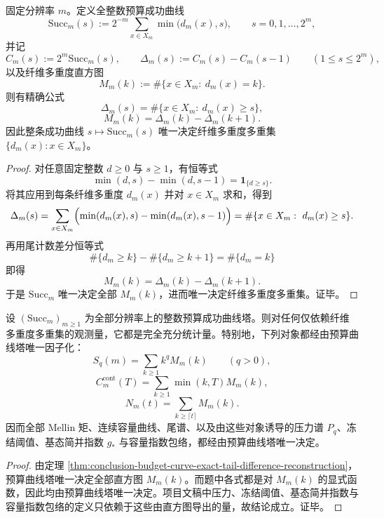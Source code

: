 \begin{theorem}[全整数预算成功曲线的完全充分性]\label{thm:conclusion-budget-curve-exact-tail-difference-reconstruction}
固定分辨率 \(m\)。定义全整数预算成功曲线
\[
\mathrm{Succ}_m(s):=
2^{-m}\sum_{x\in X_m}\min\bigl(d_m(x),s\bigr),
\qquad
s=0,1,\dots,2^m,
\]
并记
\[
C_m(s):=2^m\mathrm{Succ}_m(s),
\qquad
\Delta_m(s):=C_m(s)-C_m(s-1)
\qquad (1\le s\le 2^m),
\]
以及纤维多重度直方图
\[
M_m(k):=\#\{x\in X_m:\ d_m(x)=k\}.
\]
则有精确公式
\[
\Delta_m(s)=\#\{x\in X_m:\ d_m(x)\ge s\},
\]
\[
M_m(k)=\Delta_m(k)-\Delta_m(k+1).
\]
因此整条成功曲线 \(s\mapsto \mathrm{Succ}_m(s)\) 唯一决定纤维多重度多重集 \(\{d_m(x):x\in X_m\}\)。
\end{theorem}

\begin{proof}
对任意固定整数 \(d\ge 0\) 与 \(s\ge 1\)，有恒等式
\[
\min(d,s)-\min(d,s-1)=\mathbf 1_{\{d\ge s\}}.
\]
将其应用到每条纤维多重度 \(d_m(x)\) 并对 \(x\in X_m\) 求和，得到
\[
\Delta_m(s)
=
\sum_{x\in X_m}
\Bigl(\min(d_m(x),s)-\min(d_m(x),s-1)\Bigr)
=
\#\{x\in X_m:\ d_m(x)\ge s\}.
\]
再用尾计数差分恒等式
\[
\#\{d_m\ge k\}-\#\{d_m\ge k+1\}
=
\#\{d_m=k\}
\]
即得
\[
M_m(k)=\Delta_m(k)-\Delta_m(k+1).
\]
于是 \(\mathrm{Succ}_m\) 唯一决定全部 \(M_m(k)\)，进而唯一决定纤维多重度多重集。证毕。
\end{proof}

\begin{corollary}\label{cor:conclusion-budget-curve-mellin-renyi-factorization-layer}
设 \((\mathrm{Succ}_m)_{m\ge 1}\) 为全部分辨率上的整数预算成功曲线塔。则对任何仅依赖纤维多重度多重集的观测量，它都是完全充分统计量。特别地，下列对象都经由预算曲线塔唯一因子化：
\[
S_q(m)=\sum_{k\ge 1}k^q M_m(k)
\qquad (q>0),
\]
\[
C_m^{\mathrm{cont}}(T)=\sum_{k\ge 1}\min(k,T)M_m(k),
\]
\[
N_m(t)=\sum_{k\ge \lceil t\rceil}M_m(k).
\]
因而全部 Mellin 矩、连续容量曲线、尾谱、以及由这些对象诱导的压力谱 \(P_q\)、冻结阈值、基态简并指数 \(g_\ast\) 与容量指数包络，都经由预算曲线塔唯一决定。
\end{corollary}

\begin{proof}
由定理 \ref{thm:conclusion-budget-curve-exact-tail-difference-reconstruction}，预算曲线塔唯一决定全部直方图 \(M_m(k)\)。而题中各式都是对 \(M_m(k)\) 的显式函数，因此均由预算曲线塔唯一决定。项目文稿中压力、冻结阈值、基态简并指数与容量指数包络的定义只依赖于这些由直方图导出的量，故结论成立。证毕。
\end{proof}

